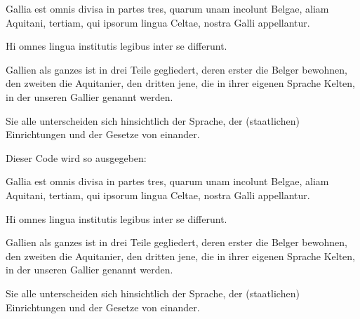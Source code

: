 \begin{lfgwcode}{}
\begin{pairs}
\begin{Leftside}
\beginnumbering
\autopar
{}

Gallia est omnis divisa in partes tres, 
    quarum unam incolunt Belgae,
    aliam Aquitani,
    tertiam, qui ipsorum lingua Celtae, nostra Galli appellantur.

Hi omnes lingua institutis legibus inter se differunt.

\endnumbering
\end{Leftside}

\begin{Rightside}
\beginnumbering
\autopar

Gallien als ganzes ist in drei Teile gegliedert,
    deren erster die Belger bewohnen,
    den zweiten die Aquitanier,
    den dritten jene, die in ihrer eigenen Sprache Kelten, in der unseren Gallier genannt werden.

Sie alle unterscheiden sich hinsichtlich der Sprache, 
    der (staatlichen) Einrichtungen und der Gesetze von einander.
    
\endnumbering
\end{Rightside}
\end{pairs}

\Columns
\end{lfgwcode}

Dieser Code wird so ausgegeben:

\begin{lfgwprint}{}
\begin{pairs}
\begin{Leftside}
\beginnumbering
\autopar
{}

Gallia est omnis divisa in partes tres, 
    quarum unam incolunt Belgae,
    aliam Aquitani,
    tertiam, qui ipsorum lingua Celtae, nostra Galli appellantur.

Hi omnes lingua institutis legibus inter se differunt.

\endnumbering
\end{Leftside}

\begin{Rightside}
\beginnumbering
\autopar

Gallien als ganzes ist in drei Teile gegliedert,
    deren erster die Belger bewohnen,
    den zweiten die Aquitanier,
    den dritten jene, die in ihrer eigenen Sprache Kelten, in der unseren Gallier genannt werden.

Sie alle unterscheiden sich hinsichtlich der Sprache, 
    der (staatlichen) Einrichtungen und der Gesetze von einander.
    
\endnumbering
\end{Rightside}
\end{pairs}

\Columns
\end{lfgwprint}

